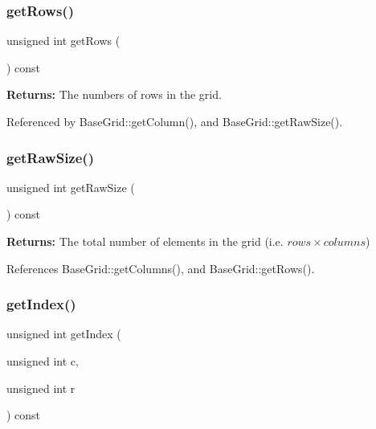\mbox{\label{classKatabatic_1_1BaseGrid_a4bad6abc58473d953258a3230506291a}} 
\subsubsection{\texorpdfstring{get\+Rows()}{getRows()}}
{\footnotesize\ttfamily unsigned int get\+Rows (\begin{DoxyParamCaption}{ }\end{DoxyParamCaption}) const\hspace{0.3cm}{\ttfamily [inline]}}

{\bfseries Returns\+:} The numbers of rows in the grid. 

Referenced by Base\+Grid\+::get\+Column(), and Base\+Grid\+::get\+Raw\+Size().

\mbox{\label{classKatabatic_1_1BaseGrid_a47cf844f090417180d0bae098133565e}} 
\subsubsection{\texorpdfstring{get\+Raw\+Size()}{getRawSize()}}
{\footnotesize\ttfamily unsigned int get\+Raw\+Size (\begin{DoxyParamCaption}{ }\end{DoxyParamCaption}) const\hspace{0.3cm}{\ttfamily [inline]}}

{\bfseries Returns\+:} The total number of elements in the grid (i.\+e. $ rows \times columns $) 

References Base\+Grid\+::get\+Columns(), and Base\+Grid\+::get\+Rows().

\mbox{\label{classKatabatic_1_1BaseGrid_aae84726d9984c1df9905fc97d9b34f28}} 
\subsubsection{\texorpdfstring{get\+Index()}{getIndex()}}
{\footnotesize\ttfamily unsigned int get\+Index (\begin{DoxyParamCaption}\item[{unsigned int}]{c,  }\item[{unsigned int}]{r }\end{DoxyParamCaption}) const\hspace{0.3cm}{\ttfamily [inline]}}

